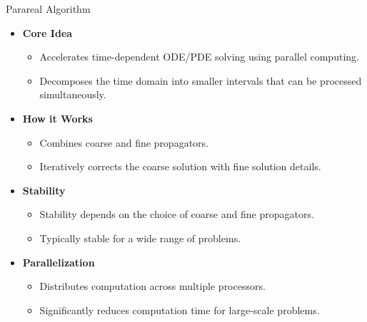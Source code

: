 \documentclass[aspectratio=169,xcolor=dvipsnames, t]{beamer}
\begin{document}
\begin{frame}{Parareal Algorithm}
    \begin{itemize}
    \item \textbf{Core Idea}
    \begin{itemize}
        \item Accelerates time-dependent ODE/PDE solving using parallel computing.
        \item Decomposes the time domain into smaller intervals that can be processed simultaneously.
    \end{itemize}
    \item \textbf{How it Works}
    \begin{itemize}
        \item Combines coarse and fine propagators.
        \item Iteratively corrects the coarse solution with fine solution details.
    \end{itemize}
    \item \textbf{Stability}
    \begin{itemize}
        \item Stability depends on the choice of coarse and fine propagators.
        \item Typically stable for a wide range of problems.
    \end{itemize}
    \item \textbf{Parallelization}
    \begin{itemize}
        \item Distributes computation across multiple processors.
        \item Significantly reduces computation time for large-scale problems.
    \end{itemize}
\end{itemize}
\end{frame}

\end{document}
